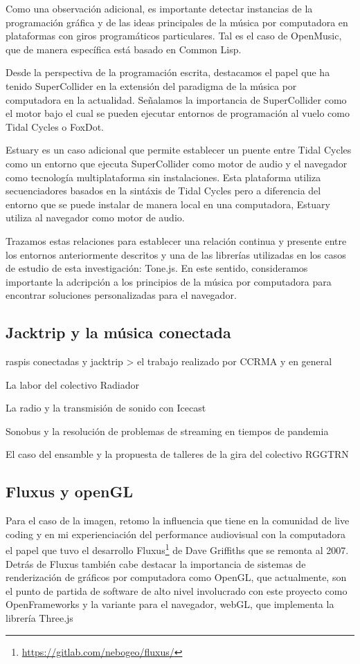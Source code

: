 Como una observación adicional, es importante detectar instancias de la programación gráfica y de las ideas principales de la música por computadora en plataformas con giros programáticos particulares. Tal es el caso de OpenMusic, que de manera específica está basado en Common Lisp.

Desde la perspectiva de la programación escrita, destacamos el papel que ha tenido SuperCollider en la extensión del paradigma de la música por computadora en la actualidad. Señalamos la importancia de SuperCollider como el motor bajo el cual se pueden ejecutar entornos de programación al vuelo como Tidal Cycles o FoxDot. 

Estuary es un caso adicional que permite establecer un puente entre Tidal Cycles como un entorno que ejecuta SuperCollider como motor de audio y el navegador como tecnología multiplataforma sin instalaciones. Esta plataforma utiliza secuenciadores basados en la sintáxis de Tidal Cycles pero a diferencia del entorno que se puede instalar de manera local en una computadora, Estuary utiliza al navegador como motor de audio. 

Trazamos estas relaciones para establecer una relación continua y presente entre los entornos anteriormente descritos y una de las librerías utilizadas en los casos de estudio de esta investigación: Tone.js. En este sentido, consideramos importante la adcripción a los principios de la música por computadora para encontrar soluciones personalizadas para el navegador.

\subsection{Jacktrip y la música conectada}

raspis conectadas y jacktrip > el trabajo realizado por CCRMA y en general 

La labor del colectivo Radiador

La radio y la transmisión de sonido con Icecast 

Sonobus y la resolución de problemas de streaming en tiempos de pandemia

El caso del ensamble y la propuesta de talleres de la gira del colectivo RGGTRN 

\subsection{Fluxus y openGL}

Para el caso de la imagen, retomo la influencia que tiene en la comunidad de live coding y en mi experienciación del performance audiovisual con la computadora el papel que tuvo el desarrollo Fluxus\footnote{\url{https://gitlab.com/nebogeo/fluxus/}} de Dave Griffiths que se remonta al 2007. Detrás de Fluxus también cabe destacar la importancia de sistemas de renderización de gráficos por computadora como OpenGL, que actualmente, son el punto de partida de software de alto nivel involucrado con este proyecto como OpenFrameworks y la variante para el navegador, webGL, que implementa la librería Three.js 

